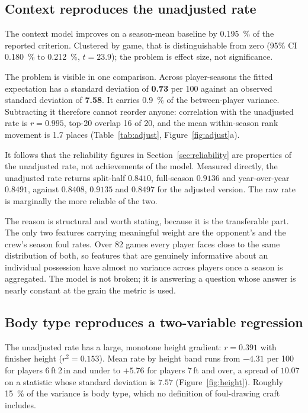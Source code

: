 \documentclass[11pt,a4paper]{article}
\begin{document}
\subsection{Context reproduces the unadjusted rate}

The context model improves on a season-mean baseline by \SI{0.195}{\percent} of
the reported criterion. Clustered by game, that is distinguishable from zero
(95\% CI \SI{0.180}{\percent} to \SI{0.212}{\percent}, $t = 23.9$); the problem
is effect size, not significance.

The problem is visible in one comparison. Across player-seasons the fitted
expectation has a standard deviation of \textbf{0.73} per 100 against an observed
standard deviation of \textbf{7.58}. It carries \SI{0.9}{\percent} of the
between-player variance. Subtracting it therefore cannot reorder anyone:
correlation with the unadjusted rate is $r = 0.995$, top-20 overlap 16 of 20, and
the mean within-season rank movement is 1.7 places (Table~\ref{tab:adjust},
Figure~\ref{fig:adjust}a).

It follows that the reliability figures in Section~\ref{sec:reliability} are
properties of the unadjusted rate, not achievements of the model. Measured
directly, the unadjusted rate returns split-half $0.8410$, full-season $0.9136$
and year-over-year $0.8491$, against $0.8408$, $0.9135$ and $0.8497$ for the
adjusted version. The raw rate is marginally the more reliable of the two.

The reason is structural and worth stating, because it is the transferable part.
The only two features carrying meaningful weight are the opponent's and the
crew's season foul rates. Over 82 games every player faces close to the same
distribution of both, so features that are genuinely informative about an
individual possession have almost no variance across players once a season is
aggregated. The model is not broken; it is answering a question whose answer is
nearly constant at the grain the metric is used.

\subsection{Body type reproduces a two-variable regression}

The unadjusted rate has a large, monotone height gradient: $r = 0.391$ with
finisher height ($r^2 = 0.153$). Mean rate by height band runs from $-4.31$ per
100 for players 6\,ft\,2\,in and under to $+5.76$ for players 7\,ft and over, a
spread of $10.07$ on a statistic whose standard deviation is $7.57$
(Figure~\ref{fig:height}). Roughly \SI{15}{\percent} of the variance is body
type, which no definition of foul-drawing craft includes.
\end{document}
